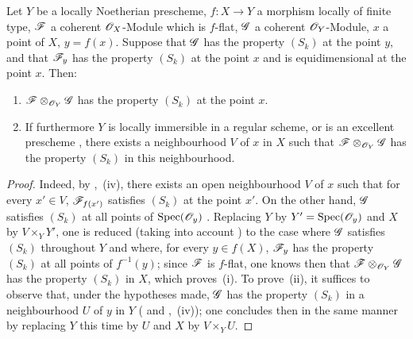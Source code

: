 \begin{corollary}[12.1.5]
\label{IV.12.1.5}
Let $Y$ be a locally Noetherian prescheme, $f:X\to Y$ a morphism locally of finite type, $\mathscr{F}$ a coherent $\mathscr{O}_X$-Module which is $f$-flat, $\mathscr{G}$ a coherent $\mathscr{O}_Y$-Module, $x$ a point of $X$, $y=f(x)$.
Suppose that $\mathscr{G}$ has the property $(S_k)$ at the point $y$, and that $\mathscr{F}_y$ has the property $(S_k)$ at the point $x$ and is equidimensional at the point $x$.
Then:
\begin{enumerate}[label=\textup{(\roman*)}]
  \item $\mathscr{F}\otimes_{\mathscr{O}_Y}\mathscr{G}$ has the property $(S_k)$ at the point $x$.
  \item If furthermore $Y$ is locally immersible in a regular scheme, or is an excellent prescheme , there exists a neighbourhood $V$ of $x$ in $X$ such that $\mathscr{F}\otimes_{\mathscr{O}_Y}\mathscr{G}$ has the property $(S_k)$ in this neighbourhood.
\end{enumerate}
\end{corollary}

\begin{proof}
Indeed, by ,~(iv), there exists an open neighbourhood $V$ of $x$ such that for every $x'\in V$, $\mathscr{F}_{f(x')}$ satisfies $(S_k)$ at the point $x'$.
On the other hand, $\mathscr{G}$ satisfies $(S_k)$ at all points of $\operatorname{Spec}(\mathscr{O}_y)$ .
Replacing $Y$ by $Y'=\operatorname{Spec}(\mathscr{O}_y)$ and $X$ by $V\times_Y Y'$, one is reduced (taking into account ) to the case where $\mathscr{G}$ satisfies $(S_k)$ throughout $Y$ and where, for every $y\in f(X)$, $\mathscr{F}_y$ has the property $(S_k)$ at all points of $f^{-1}(y)$; since $\mathscr{F}$ is $f$-flat, one knows then  that $\mathscr{F}\otimes_{\mathscr{O}_Y}\mathscr{G}$ has the property $(S_k)$ in $X$, which proves~(i).
To prove~(ii), it suffices to observe that, under the hypotheses made, $\mathscr{G}$ has the
property $(S_k)$ in a neighbourhood $U$ of $y$ in $Y$ ( and ,~(iv)); one concludes then in the same manner by replacing $Y$ this time by $U$ and $X$ by $V\times_Y U$.
\end{proof}

